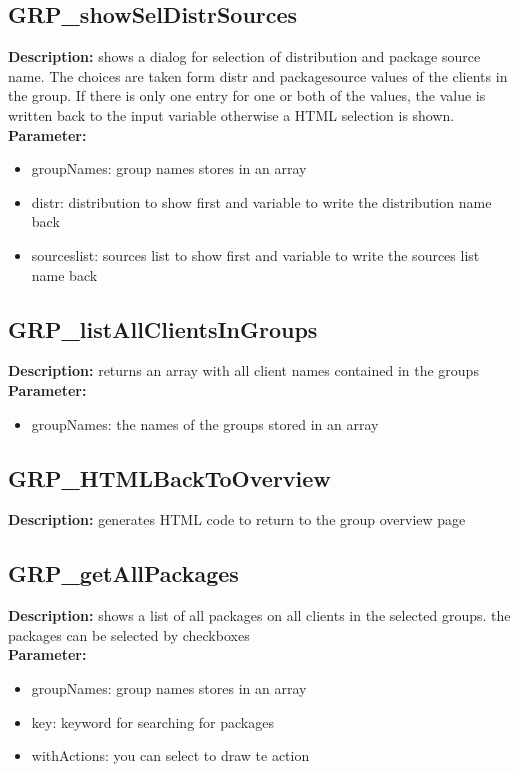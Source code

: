 \subsection{GRP\_showSelDistrSources}
\textbf{Description:} shows a dialog for selection of distribution and package source name. The choices are taken form distr and packagesource values of the clients in the group. If there is only one entry for one or both of the values, the value is written back to the input variable otherwise a HTML selection is shown.\\
\textbf{Parameter:}
\begin{itemize}
\item groupNames: group names stores in an array
\item distr: distribution to show first and variable to write the distribution name back
\item sourceslist: sources list to show first and variable to write the sources list name back
\end{itemize}

\subsection{GRP\_listAllClientsInGroups}
\textbf{Description:} returns an array with all client names contained in the groups\\
\textbf{Parameter:}
\begin{itemize}
\item groupNames: the names of the groups stored in an array
\end{itemize}

\subsection{GRP\_HTMLBackToOverview}
\textbf{Description:} generates HTML code to return to the group overview page\\

\subsection{GRP\_getAllPackages}
\textbf{Description:} shows a list of all packages on all clients in the selected groups. the packages can be selected by checkboxes\\
\textbf{Parameter:}
\begin{itemize}
\item groupNames: group names stores in an array
\item key: keyword for searching for packages
\item withActions: you can select to draw te action 
\end{itemize}

